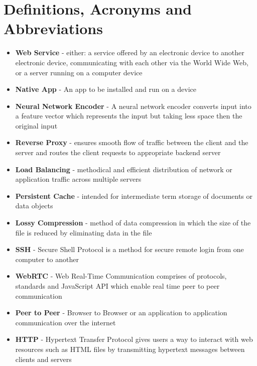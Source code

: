 \section{Definitions, Acronyms and Abbreviations}
\begin{itemize}
    \item \textbf{Web Service} - either: a service offered by an electronic device to another electronic device, communicating with each other via the World Wide Web, or a server running on a computer device
    \item \textbf{Native App} - An app to be installed and run on a device
    \item \textbf{Neural Network Encoder} - A neural network encoder converts input into a feature vector which represents the input but taking less space then the original input
    \item \textbf{Reverse Proxy} - ensures smooth flow of traffic between the client and the server and routes the client requests to appropriate backend server
    \item \textbf{Load Balancing} - methodical and efficient distribution of network or application traffic across multiple servers
    \item \textbf{Persistent Cache} - intended for intermediate term storage of documents or data objects
    \item \textbf{Lossy Compression} - method of data compression in which the size of the file is reduced by eliminating data in the file
    \item \textbf{SSH} - Secure Shell Protocol is a method for secure remote login from one computer to another
    \item \textbf{WebRTC} - Web Real-Time Communication comprises of protocols, standards and JavaScript API which enable real time peer to peer communication
    \item \textbf{Peer to Peer} - Browser to Browser or an application to application communication over the internet
    \item \textbf{HTTP} - Hypertext Transfer Protocol gives users a way to interact with web resources such as HTML files by transmitting hypertext messages between clients and servers
\end{itemize}
